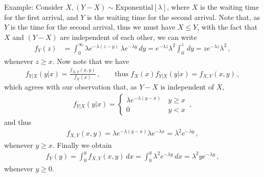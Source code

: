 \documentclass[11pt, onesided]{book}
\theoremstyle{break}
\theoremstyle{break}
\newcommand{\example}{\color{green}Example: \color{black}}
\begin{document}
\example Consider $X,(Y-X) \sim \text{Exponential}[\lambda]$, where $X$ is the waiting time for the first arrival, and $Y$ is the waiting time for the second arrival. Note that, as $Y$ is the time for the second arrival, thus we must have $X\leq Y$, with the fact that $X$ and $(Y-X)$ are independent of each other, we can write
\begin{align*}
f_Y(z) 
&= \int_{0}^\infty \lambda e^{-\lambda (z-y)}\, \lambda e^{-\lambda y}\, dy= e^{-\lambda z}\lambda^2 \int_0^z \, dy = ze^{- \lambda z}\lambda^2\,,
\end{align*}
whenever $z\geq x$. Now note that we have
\begin{align*}
f_{Y|X}(y|x) = \frac{f_{X,Y}(x,y)}{f_X(x)}\,,\qquad\text{thus }f_X(x) f_{Y|X}(y|x) = f_{X,Y}(x,y)\,,
\end{align*}
which agrees with our observation that, as $Y-X$ is independent of $X$,  
\begin{align*}
f_{Y|X}(y|x) = \begin{cases}
\lambda e^{-\lambda ( y-x)}\, & y \geq x\\
0 & y<x
\end{cases}\,,
\end{align*}
and thus
\begin{align*}
f_{X,Y}(x,y) = \lambda e^{-\lambda(y-x)}\lambda e^{-\lambda x} = \lambda^2 e^{-\lambda y}\,,
\end{align*}
whenever $y\geq x$. Finally we obtain
\begin{align*}
f_Y(y) = \int_0^y f_{X,Y}(x,y)\, dx = \int_0^y \lambda^2 e^{-\lambda y}\, dx = \lambda^2 y e^{-\lambda y}\,,
\end{align*}
whenever $y \geq 0$. \\
\end{document}
